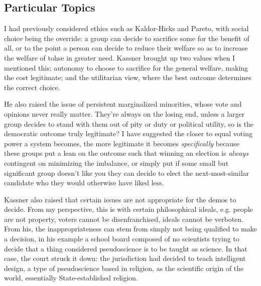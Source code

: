 \subsection{Particular Topics}

I had previously considered ethics such as Kaldor-Hicks and Pareto, with social choice being the override:  a group can decide to sacrifice some for the benefit of all, or to the point a person can decide to reduce their welfare so as to increase the welfare of tohse in greater need.  Kassner brought up two values when I mentioned this:  autonomy to choose to sacrifice for the general welfare, making the cost legitimate; and the utilitarian view, where the best outcome determines the correct choice.

He also raised the issue of persistent marginalized minorities, whose vote and opinions never really matter.  They're always on the losing end, unless a larger group decides to stand with them out of pity or duty or political utility, so is the democratic outcome truly legitimate?  I have suggested the closer to equal voting power a system becomes, the more legitimate it becomes \textit{specifically} because these groups put a lean on the outcome such that winning an election is \textit{always} contingent on minimizing the imbalance, or simply put if some small but significant group doesn't like you they can decide to elect the next-most-similar candidate who they would otherwise have liked less.

Kassner also raised that certain issues are not appropriate for the demos to decide.  From my perspective, this is with certain philosophical ideals, e.g. people are not property, voters cannot be disenfranchised, ideals cannot be verboten.  From his, the inappropriateness can stem from simply not being qualified to make a decision, in his example a school board composed of no scientists trying to decide that a thing considered pseudoscience is to be taught as science.  In that case, the court struck it down:  the jurisdiction had decided to teach intelligent design, a type of pseudoscience based in religion, as the scientific origin of the world, essentially State-established religion.




